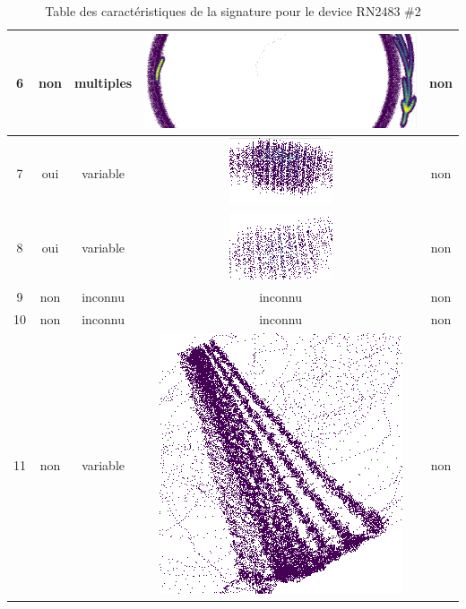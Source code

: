 \begin{table}[h]
\begin{tabular}{|c|c|c|c|c|}
\hline
6 & non & multiples & \includegraphics[scale=0.35]{images/set17.png}  & non \\
\hline
7 & oui & variable & \includegraphics[scale=0.2]{images/set18.png}  & non \\
\hline
8 & oui & variable & \includegraphics[scale=0.2]{images/set19.png}  & non \\
\hline
9 & non & inconnu & inconnu & non \\
\hline
10 & non & inconnu & inconnu  & non \\
\hline
11 & non & variable & \includegraphics[scale=0.2]{images/set22.png}  & non \\
\hline
\end{tabular}
\caption{Table des caractéristiques de la signature pour le device RN2483 \#2}
\label{signature2}
\end{table}

